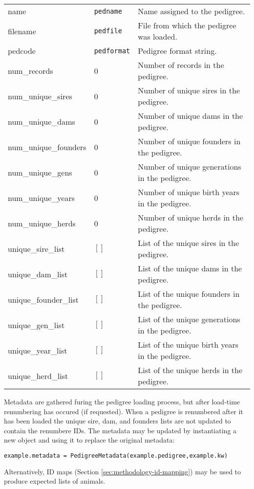 \begin{center}
    \tablelasttail{\hline}
    \label{tbl:objects-metadata-attributes}
    \begin{xtabular}{l|l|p{4in}}
        name & \texttt{pedname} & Name assigned to the pedigree. \\
        filename & \texttt{pedfile} & File from which the pedigree was loaded. \\
        pedcode & \texttt{pedformat} & Pedigree format string. \\
        num_records & 0 & Number of records in the pedigree. \\
        num_unique_sires & 0 & Number of unique sires in the pedigree. \\
        num_unique_dams & 0 & Number of unique dams in the pedigree. \\
        num_unique_founders & 0 & Number of unique founders in the pedigree. \\
        num_unique_gens & 0 & Number of unique generations in the pedigree. \\
        num_unique_years & 0 & Number of unique birth years in the pedigree. \\
        num_unique_herds & 0 & Number of unique herds in the pedigree. \\
        unique_sire_list & $[]$ & List of the unique sires in the pedigree. \\
        unique_dam_list & $[]$ & List of the unique dams in the pedigree. \\
        unique_founder_list & $[]$ & List of the unique founders in the pedigree. \\
        unique_gen_list & $[]$ & List of the unique generations in the pedigree. \\
        unique_year_list & $[]$ & List of the unique birth years in the pedigree. \\
        unique_herd_list & $[]$ & List of the unique herds in the pedigree. \\
    \end{xtabular}
\end{center}
Metadata are gathered furing the pedigree loading process, but after load-time renumbering has occured (if requested). When a pedigree is renumbered after it has been loaded the unique sire, dam, and founders lists are not updated to contain the renumbere IDs. The metadata may be updated by instantiating a new  object and using it to replace the original metadata:
\begin{verbatim}
example.metadata = PedigreeMetadata(example.pedigree,example.kw)
\end{verbatim}
Alternatively, ID maps (Section \ref{sec:methodology-id-mapping}) may be used to produce expected lists of animals.

